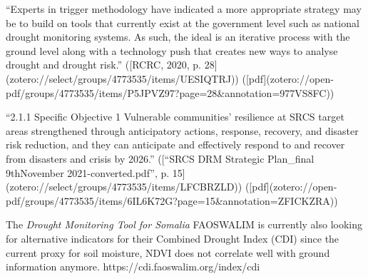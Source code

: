 “Experts in trigger methodology have indicated a more appropriate strategy may be to build on tools that currently exist at the government level such as national drought monitoring systems. As such, the ideal is an iterative process with the ground level along with a technology push that creates new ways to analyse drought and drought risk.” ([RCRC, 2020, p. 28](zotero://select/groups/4773535/items/UESIQTRJ)) ([pdf](zotero://open-pdf/groups/4773535/items/P5JPVZ97?page=28&annotation=977VS8FC))

“2.1.1 Specific Objective 1 Vulnerable communities’ resilience at SRCS target areas strengthened through anticipatory actions, response, recovery, and disaster risk reduction, and they can anticipate and effectively respond to and recover from disasters and crisis by 2026.” ([“SRCS DRM Strategic Plan_final 9thNovember 2021-converted.pdf”, p. 15](zotero://select/groups/4773535/items/LFCBRZLD)) ([pdf](zotero://open-pdf/groups/4773535/items/6IL6K72G?page=15&annotation=ZFICKZRA))




The \textit{Drought Monitoring Tool for Somalia} FAOSWALIM is currently also looking for alternative indicators for their Combined Drought Index (CDI) since the current proxy for soil moisture, NDVI does not correlate well with ground information anymore.  https://cdi.faoswalim.org/index/cdi

